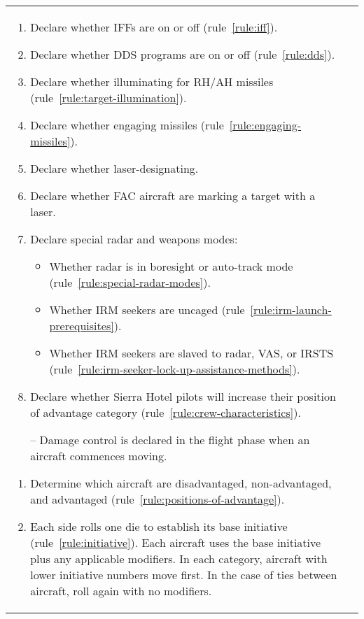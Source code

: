 \begin{twocolumntablefloat}
\begin{twocolumntable}
\begin{tabularx}{1.0\linewidth}{L@{\hspace{\columnsep}}L}
{\begin{enumerate}[topsep=0pt]
\begin{enumerate}[nosep]
    \item Declare whether IFFs are on or off (rule~\ref{rule:iff}).
    \item Declare whether DDS programs are on or off (rule~\ref{rule:dds}).
    \item Declare whether illuminating for RH/AH missiles (rule~\ref{rule:target-illumination}).
    \item Declare whether engaging missiles (rule~\ref{rule:engaging-missiles}).
    \item Declare whether laser-designating.
    \item Declare whether FAC aircraft are marking a target with a laser.
    \item Declare special radar and weapons modes:
    \begin{itemize}
        \item Whether radar is in boresight or auto-track mode (rule~\ref{rule:special-radar-modes}).
        \item Whether IRM seekers are uncaged (rule~\ref{rule:irm-launch-prerequisites}).
        \item Whether IRM seekers are slaved to radar, VAS, or IRSTS (rule~\ref{rule:irm-seeker-lock-up-assistance-methods}).
    \end{itemize}
    \item Declare whether Sierra Hotel pilots will increase their position of advantage category (rule~\ref{rule:crew-characteristics}).
    \item[--] Damage control is declared in the flight phase when an aircraft commences moving.
\end{enumerate}


\begin{enumerate}[nosep]
    \item Determine which aircraft are disadvantaged, non-advantaged, and advantaged (rule~\ref{rule:positions-of-advantage}).
    \item Each side rolls one die to establish its base initiative (rule~\ref{rule:initiative}). Each aircraft uses the base initiative plus any applicable modifiers. In each category, aircraft with lower initiative numbers move first. In the case of ties between aircraft, roll again with no modifiers.
\end{enumerate}

\end{enumerate}

}
\end{tabularx}
\end{twocolumntable}
\end{twocolumntablefloat}
